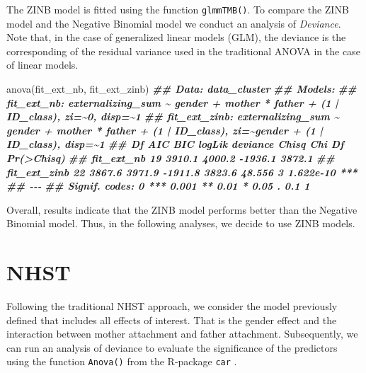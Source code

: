 \documentclass[
]{book}
\newenvironment{Shaded}{\begin{snugshade}}{\end{snugshade}}
\newcommand{\DocumentationTok}[1]{\textcolor[rgb]{0.56,0.35,0.01}{\textbf{\textit{#1}}}}
\newcommand{\FunctionTok}[1]{\textcolor[rgb]{0.00,0.00,0.00}{#1}}
\newcommand{\NormalTok}[1]{#1}
\begin{document}
The ZINB model is fitted using the function \texttt{glmmTMB()}. To compare the ZINB model and the Negative Binomial model we conduct an analysis of \emph{Deviance}. Note that, in the case of generalized linear models (GLM), the deviance is the corresponding of the residual variance used in the traditional ANOVA in the case of linear models.

\begin{Shaded}
\begin{Highlighting}[]
\FunctionTok{anova}\NormalTok{(fit\_ext\_nb, fit\_ext\_zinb)}
\DocumentationTok{\#\# Data: data\_cluster}
\DocumentationTok{\#\# Models:}
\DocumentationTok{\#\# fit\_ext\_nb: externalizing\_sum \textasciitilde{} gender + mother * father + (1 | ID\_class), zi=\textasciitilde{}0, disp=\textasciitilde{}1}
\DocumentationTok{\#\# fit\_ext\_zinb: externalizing\_sum \textasciitilde{} gender + mother * father + (1 | ID\_class), zi=\textasciitilde{}gender + (1 | ID\_class), disp=\textasciitilde{}1}
\DocumentationTok{\#\#              Df    AIC    BIC  logLik deviance  Chisq Chi Df Pr(\textgreater{}Chisq)    }
\DocumentationTok{\#\# fit\_ext\_nb   19 3910.1 4000.2 {-}1936.1   3872.1                             }
\DocumentationTok{\#\# fit\_ext\_zinb 22 3867.6 3971.9 {-}1911.8   3823.6 48.556      3  1.622e{-}10 ***}
\DocumentationTok{\#\# {-}{-}{-}}
\DocumentationTok{\#\# Signif. codes:  0 \textquotesingle{}***\textquotesingle{} 0.001 \textquotesingle{}**\textquotesingle{} 0.01 \textquotesingle{}*\textquotesingle{} 0.05 \textquotesingle{}.\textquotesingle{} 0.1 \textquotesingle{} \textquotesingle{} 1}
\end{Highlighting}
\end{Shaded}

Overall, results indicate that the ZINB model performs better than the Negative Binomial model. Thus, in the following analyses, we decide to use ZINB models.

\hypertarget{nhst-ext}{%
\chapter{NHST}\label{nhst-ext}}

Following the traditional NHST approach, we consider the model previously defined that includes all effects of interest. That is the gender effect and the interaction between mother attachment and father attachment. Subsequently, we can run an analysis of deviance to evaluate the significance of the predictors using the function \texttt{Anova()} from the R-package \texttt{car} \citep{foxCompanionAppliedRegression2019}.
\end{document}
